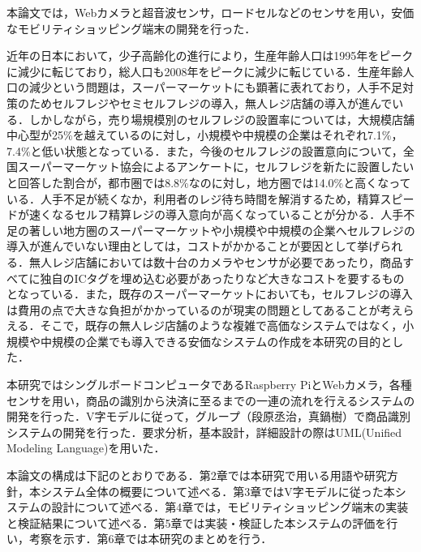 


本論文では，Webカメラと超音波センサ，ロードセルなどのセンサを用い，安価なモビリティショッピング端末の開発を行った．

近年の日本において，少子高齢化の進行により，生産年齢人口は1995年をピークに減少に転じており，総人口も2008年をピークに減少に転じている\cite{population}．生産年齢人口の減少という問題は，スーパーマーケットにも顕著に表れており，人手不足対策のためセルフレジやセミセルフレジの導入，無人レジ店舗の導入が進んでいる．しかしながら，売り場規模別のセルフレジの設置率については，大規模店舗中心型が25\%を越えているのに対し，小規模や中規模の企業はそれぞれ7.1\%，7.4\%\cite{super}と低い状態となっている．また，今後のセルフレジの設置意向について，全国スーパーマーケット協会によるアンケートに，セルフレジを新たに設置したいと回答した割合が，都市圏では8.8\%なのに対し，地方圏では14.0\%\cite{super}と高くなっている．人手不足が続くなか，利用者のレジ待ち時間を解消するため，精算スピードが速くなるセルフ精算レジの導入意向が高くなっていることが分かる\cite{super}．人手不足の著しい地方圏のスーパーマーケットや小規模や中規模の企業へセルフレジの導入が進んでいない理由としては，コストがかかることが要因として挙げられる．無人レジ店舗においては数十台のカメラやセンサが必要であったり，商品すべてに独自のICタグを埋め込む必要があったりなど大きなコストを要するものとなっている．また，既存のスーパーマーケットにおいても，セルフレジの導入は費用の点で大きな負担がかかっているのが現実の問題としてあることが考えらえる．そこで，既存の無人レジ店舗のような複雑で高価なシステムではなく，小規模や中規模の企業でも導入できる安価なシステムの作成を本研究の目的とした．

本研究ではシングルボードコンピュータであるRaspberry PiとWebカメラ，各種センサを用い，商品の識別から決済に至るまでの一連の流れを行えるシステムの開発を行った．V字モデルに従って，グループ（段原丞治，真鍋樹）で商品識別システムの開発を行った．要求分析，基本設計，詳細設計の際はUML(Unified Modeling Language)を用いた．

本論文の構成は下記のとおりである．第2章では本研究で用いる用語や研究方針，本システム全体の概要について述べる．第3章ではV字モデルに従った本システムの設計について述べる．第4章では，モビリティショッピング端末の実装と検証結果について述べる．第5章では実装・検証した本システムの評価を行い，考察を示す．第6章では本研究のまとめを行う．